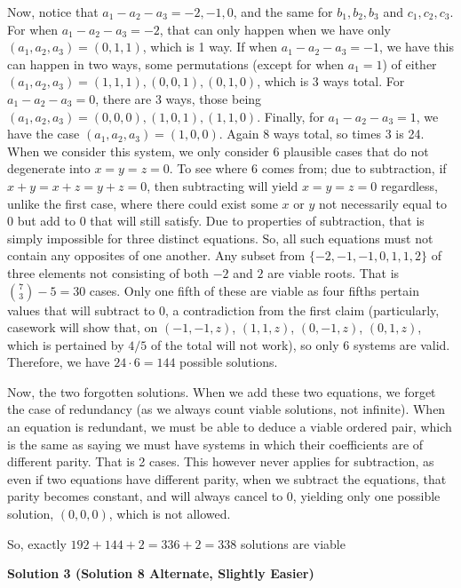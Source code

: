 \begin{enumerate}
 Now, notice that $a_1 - a_2 - a_3 = -2, -1, 0$, and the same for $b_1, b_2, b_3$ and $c_1, c_2, c_3$. For when $a_1 - a_2 -a_3 = -2$, that can only happen when we have only $(a_1, a_2, a_3) = (0, 1, 1)$, which is 1 way. If when $a_1 - a_2 - a_3 = -1$, we have this can happen in two ways, some permutations (except for when $a_1 = 1$) of either $(a_1, a_2, a_3) = (1,1,1), (0,0,1), (0,1,0)$, which is 3 ways total. For $a_1 - a_2 - a_3 = 0$, there are 3 ways, those being $(a_1,a_2,a_3) = (0,0,0), (1,0,1), (1,1,0)$. Finally, for $a_1 - a_2 - a_3 = 1$, we have the case $(a_1, a_2, a_3) = (1,0,0)$. Again 8 ways total, so times 3 is 24. When we consider this system, we only consider 6 plausible cases that do not degenerate into $x=y=z = 0$. To see where 6 comes from; due to subtraction, if $x+y = x+z = y+z = 0$, then subtracting will yield $x = y = z =0$ regardless, unlike the first case, where there could exist some $x$ or $y$ not necessarily equal to 0 but add to 0 that will still satisfy. Due to properties of subtraction, that is simply impossible for three distinct equations. So, all such equations must not contain any opposites of one another. Any subset from $\{-2, -1, -1, 0, 1, 1, 2 \}$ of three elements not consisting of both $-2$ and $2$ are viable roots. That is $\binom{7}{3} - 5 = 30$ cases. Only one fifth of these are viable as four fifths pertain values that will subtract to 0, a contradiction from the first claim (particularly, casework will show that, on $(-1,-1, z)$, $(1,1,z)$, $(0,-1,z)$, $(0,1,z)$, which is pertained by $4/5$ of the total will not work), so only 6 systems are valid. Therefore, we have $24 \cdot 6 = 144$ possible solutions.

 Now, the two forgotten solutions. When we add these two equations, we forget the case of redundancy (as we always count viable solutions, not infinite). When an equation is redundant, we must be able to deduce a viable ordered pair, which is the same as saying we must have systems in which their coefficients are of different parity. That is 2 cases. This however never applies for subtraction, as even if two equations have different parity, when we subtract the equations, that parity becomes constant, and will always cancel to 0, yielding only one possible solution, $(0,0,0)$, which is not allowed.

 So, exactly $192+144+2 = 336 + 2 = \boxed{338}$ solutions are viable

 



\textbf{Solution 3 (Solution 8 Alternate, Slightly Easier)}


\end{enumerate}
